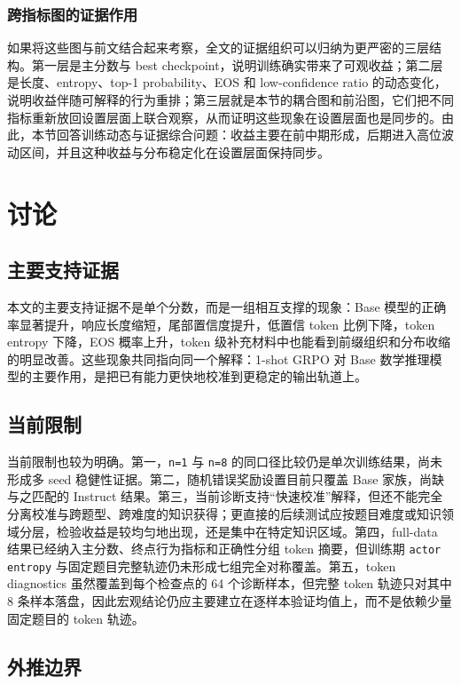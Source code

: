 \documentclass[12pt,a4paper]{ctexart}
\begin{document}
\subsubsection{跨指标图的证据作用}

如果将这些图与前文结合起来考察，全文的证据组织可以归纳为更严密的三层结构。第一层是主分数与 best checkpoint，说明训练确实带来了可观收益；第二层是长度、entropy、top-1 probability、EOS 和 low-confidence ratio 的动态变化，说明收益伴随可解释的行为重排；第三层就是本节的耦合图和前沿图，它们把不同指标重新放回设置层面上联合观察，从而证明这些现象在设置层面也是同步的。由此，本节回答训练动态与证据综合问题：收益主要在前中期形成，后期进入高位波动区间，并且这种收益与分布稳定化在设置层面保持同步。

\section{讨论}

\subsection{主要支持证据}

本文的主要支持证据不是单个分数，而是一组相互支撑的现象：Base 模型的正确率显著提升，响应长度缩短，尾部置信度提升，低置信 token 比例下降，token entropy 下降，EOS 概率上升，token 级补充材料中也能看到前缀组织和分布收缩的明显改善。这些现象共同指向同一个解释：1-shot GRPO 对 Base 数学推理模型的主要作用，是把已有能力更快地校准到更稳定的输出轨道上。

\subsection{当前限制}

当前限制也较为明确。第一，\texttt{n=1} 与 \texttt{n=8} 的同口径比较仍是单次训练结果，尚未形成多 seed 稳健性证据。第二，随机错误奖励设置目前只覆盖 Base 家族，尚缺与之匹配的 Instruct 结果。第三，当前诊断支持“快速校准”解释，但还不能完全分离校准与跨题型、跨难度的知识获得；更直接的后续测试应按题目难度或知识领域分层，检验收益是较均匀地出现，还是集中在特定知识区域。第四，full-data 结果已经纳入主分数、终点行为指标和正确性分组 token 摘要，但训练期 \texttt{actor entropy} 与固定题目完整轨迹仍未形成七组完全对称覆盖。第五，token diagnostics 虽然覆盖到每个检查点的 64 个诊断样本，但完整 token 轨迹只对其中 8 条样本落盘，因此宏观结论仍应主要建立在逐样本验证均值上，而不是依赖少量固定题目的 token 轨迹。

\subsection{外推边界}
\end{document}
